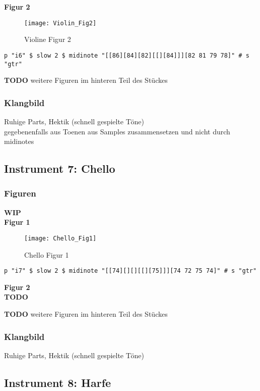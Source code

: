 \documentclass[
10pt, %
a4paper, %
oneside, %
headinclude,footinclude, %
BCOR5mm, %
]{scrartcl}
\begin{document}
\noindent\textbf{Figur 2}\\
\begin{figure}[h]
	\centering 
	\texttt{[image: Violin\_Fig2]} 
	\caption{Violine Figur 2}
\end{figure}

\begin{lstlisting}
p "i6" $ slow 2 $ midinote "[[86][84][82][[][84]]][82 81 79 78]" # s "gtr"
\end{lstlisting}

{\color{red}\textbf{TODO}} weitere Figuren im hinteren Teil des Stückes

\subsubsection{Klangbild}
Ruhige Parts, Hektik (schnell gespielte Töne)\\
gegebenenfalls aus Toenen aus Samples zusammensetzen und nicht durch midinotes


\subsection{Instrument 7: Chello}
\subsubsection{Figuren}
{\color{orange}\textbf{WIP}} \\
\noindent\textbf{Figur 1}\\
\begin{figure}[h]
	\centering 
	\texttt{[image: Chello\_Fig1]} 
	\caption{Chello Figur 1}
\end{figure}

\begin{lstlisting}
p "i7" $ slow 2 $ midinote "[[74][][][[][75]]][74 72 75 74]" # s "gtr"
\end{lstlisting}

\noindent\textbf{Figur 2}\\
{\color{red}\textbf{TODO}} 


{\color{red}\textbf{TODO}} weitere Figuren im hinteren Teil des Stückes

\subsubsection{Klangbild}
Ruhige Parts, Hektik (schnell gespielte Töne)


\subsection{Instrument 8: Harfe}
\end{document}
